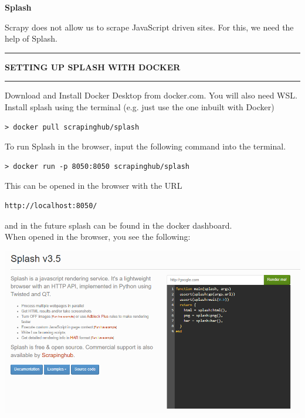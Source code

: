 \documentclass[8pt]{extarticle}
\newcommand{\heading}[1]{%
    \noindent
    \rule{\linewidth}{0.4pt}
    \begin{center}
        \vspace{-1ex}
        \textbf{#1}        
        \vspace{-2.5ex}
    \end{center}
    \rule{\linewidth}{0.4pt}
}
\begin{document}
\begin{center}
{\huge\textbf{Splash}}
\vspace*{0.75cm}
\end{center}

\begin{multicols}{3}
\setlength{\columnseprule}{1pt} %

Scrapy does not allow us to scrape JavaScript driven sites. For this, we need the help of Splash.

\heading{SETTING UP SPLASH WITH DOCKER}

Download and Install Docker Desktop from docker.com. You will also need WSL.\\

Install splash using the terminal (e.g. just use the one inbuilt with Docker)
\begin{lstlisting}[style=python]
    > docker pull scrapinghub/splash  
\end{lstlisting}

To run Splash in the browser, input the following command into the terminal.
\begin{lstlisting}[style=python]
    > docker run -p 8050:8050 scrapinghub/splash 
\end{lstlisting}

This can be opened in the browser with the URL
\begin{lstlisting}[style=python]
    http://localhost:8050/
\end{lstlisting}
and in the future splash can be found in the docker dashboard.\\

When opened in the browser, you see the following:

\begin{center}
    \includegraphics[width=\columnwidth]{images/splash.png}
\end{center}


\end{multicols}
\end{document}
